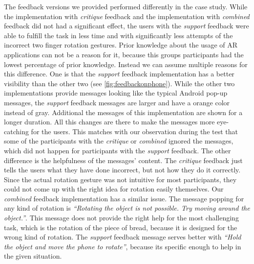 \documentclass[11pt, a4paper]{article}
\begin{document}
			The feedback versions we provided performed differently in the case study. While the implementation with \emph{critique} feedback and the implementation with \emph{combined} feedback did not had a significant effect, the users with the \emph{support} feedback were able to fulfill the task in less time and with significantly less attempts of the incorrect two finger rotation gestures. Prior knowledge about the usage of \ac{AR} applications can not be a reason for it, because this groups participants had the lowest percentage of prior knowledge. Instead we can assume multiple reasons for this difference. One is that the \emph{support} feedback implementation has a better visibility than the other two (see \ref{fig:feedbackonphone}). While the other two implementations provide messages looking like the typical Android pop-up messages, the \emph{support} feedback messages are larger and have a orange color instead of gray. Additional the messages of this implementation are shown for a longer duration. All this changes are there to make the messages more eye-catching for the users. This matches with our observation during the test that some of the participants with the \emph{critique} or \emph{combined} ignored the messages, which did not happen for participants with the \emph{support} feedback. The other difference is the helpfulness of the messages' content. The \emph{critique} feedback just tells the users what they have done incorrect, but not how they do it correctly. Since the actual rotation gesture was not intuitive for most participants, they could not come up with the right idea for rotation easily themselves. Our \emph{combined} feedback implementation has a similar issue. The message popping for any kind of rotation is \emph{``Rotating the object is not possible. Try moving around the object.''}. This message does not provide the right help for the most challenging task, which is the rotation of the piece of bread, because it is designed for the wrong kind of rotation. The \emph{support} feedback message serves better with \emph{``Hold the object and move the phone to rotate''}, because its specific enough to help in the given situation.			
			
\end{document}
